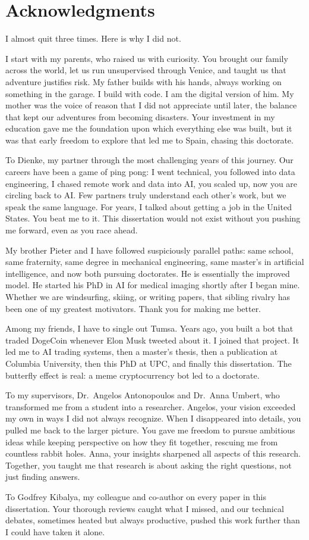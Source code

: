 \chapter*{Acknowledgments}

I almost quit three times. Here is why I did not.

I start with my parents, who raised us with curiosity. You brought our family across the world, let us run unsupervised through Venice, and taught us that adventure justifies risk. My father builds with his hands, always working on something in the garage. I build with code. I am the digital version of him. My mother was the voice of reason that I did not appreciate until later, the balance that kept our adventures from becoming disasters. Your investment in my education gave me the foundation upon which everything else was built, but it was that early freedom to explore that led me to Spain, chasing this doctorate.

To Dienke, my partner through the most challenging years of this journey. Our careers have been a game of ping pong: I went technical, you followed into data engineering, I chased remote work and data into AI, you scaled up, now you are circling back to AI. Few partners truly understand each other's work, but we speak the same language. For years, I talked about getting a job in the United States. You beat me to it. This dissertation would not exist without you pushing me forward, even as you race ahead.

My brother Pieter and I have followed suspiciously parallel paths: same school, same fraternity, same degree in mechanical engineering, same master's in artificial intelligence, and now both pursuing doctorates. He is essentially the improved model. He started his PhD in AI for medical imaging shortly after I began mine. Whether we are windsurfing, skiing, or writing papers, that sibling rivalry has been one of my greatest motivators. Thank you for making me better.

Among my friends, I have to single out Tumsa. Years ago, you built a bot that traded DogeCoin whenever Elon Musk tweeted about it. I joined that project. It led me to AI trading systems, then a master's thesis, then a publication at Columbia University, then this PhD at UPC, and finally this dissertation. The butterfly effect is real: a meme cryptocurrency bot led to a doctorate.

To my supervisors, Dr.~Angelos Antonopoulos and Dr.~Anna Umbert, who transformed me from a student into a researcher. Angelos, your vision exceeded my own in ways I did not always recognize. When I disappeared into details, you pulled me back to the larger picture. You gave me freedom to pursue ambitious ideas while keeping perspective on how they fit together, rescuing me from countless rabbit holes. Anna, your insights sharpened all aspects of this research. Together, you taught me that research is about asking the right questions, not just finding answers.

To Godfrey Kibalya, my colleague and co-author on every paper in this dissertation. Your thorough reviews caught what I missed, and our technical debates, sometimes heated but always productive, pushed this work further than I could have taken it alone.

